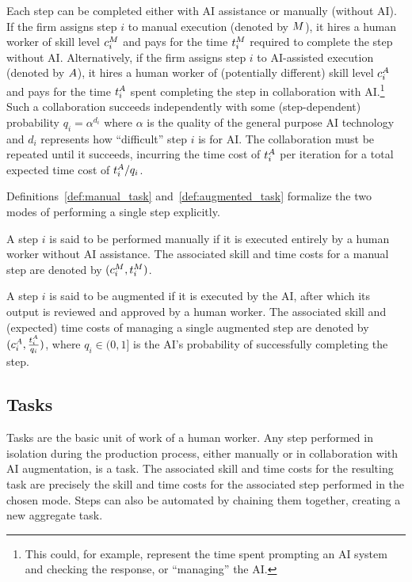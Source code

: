 Each step can be completed either with AI assistance or manually (without AI).  
If the firm assigns step $i$ to manual execution (denoted by $M$), it hires a human worker of skill level $c^{M}_{i}$ and pays for the time $t^{M}_{i}$ required to complete the step without AI.  
Alternatively, if the firm assigns step $i$ to AI-assisted execution (denoted by $A$), it hires a human worker of (potentially different) skill level $c^{A}_{i}$ and pays for the time $t^{A}_{i}$ spent completing the step in collaboration with AI.\footnote{
This could, for example, represent the time spent prompting an AI system and checking the response, or ``managing'' the AI.
}
Such a collaboration succeeds independently with some (step-dependent) probability $q_i=\alpha^{d_i}$ where $\alpha$ is the quality of the general purpose AI technology and $d_i$ represents how ``difficult'' step $i$ is for AI.
The collaboration must be repeated until it succeeds, incurring the time cost of $t^{A}_{i}$ per iteration for a total expected time cost of $t^{A}_{i}/q_i$.

Definitions~\ref{def:manual_task} and~\ref{def:augmented_task} formalize the two modes of performing a single step explicitly.

\begin{definition}
\label{def:manual_task}
A step $i$ is said to be performed manually if it is executed entirely by a human worker without AI assistance.
The associated skill and time costs for a manual step are denoted by $(c^{M}_{i}, t^{M}_{i})$.
\end{definition}

\begin{definition}
\label{def:augmented_task}
A step $i$ is said to be augmented if it is executed by the AI, after which its output is reviewed and approved by a human worker.
The associated skill and (expected) time costs of managing a single augmented step are denoted by $(c^{A}_{i}, \frac{t^{A}_{i}}{q_i})$, where $q_i \in (0,1]$ is the AI's probability of successfully completing the step.
\end{definition}



\subsection{Tasks}
\label{sec:model.tasks}

Tasks are the basic unit of work of a human worker.  
Any step performed in isolation during the production process, either manually or in collaboration with AI augmentation, is a task.  
The associated skill and time costs for the resulting task are precisely the skill and time costs for the associated step performed in the chosen mode.  
Steps can also be automated by chaining them together, creating a new aggregate task.

